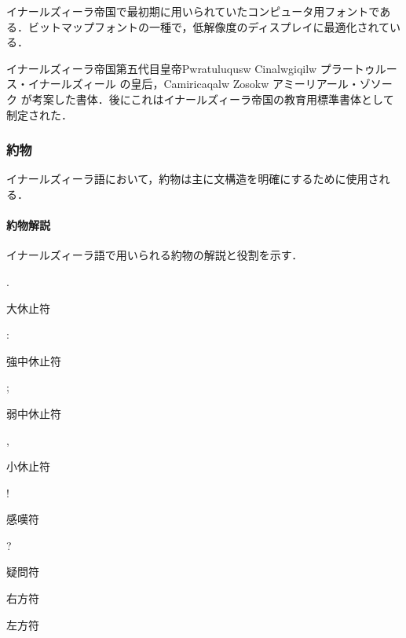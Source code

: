 \documentclass[
  japanese,
]{article}
\providecommand{\tightlist}{%
  \setlength{\itemsep}{0pt}\setlength{\parskip}{0pt}}
\begin{document}
\begin{description}
\begin{description}
\tightlist
\item[マキーナ体\\
{makina}]
イナールズィーラ帝国で最初期に用いられていたコンピュータ用フォントである．ビットマップフォントの一種で，低解像度のディスプレイに最適化されている．
\item[ポルゴ体\\
{polwgo}]
\item[ゾソーク体\\
{zosokw}]
イナールズィーラ帝国第五代目皇帝{Pwratuluqusw Cinalwgiqilw}
プラートゥルース・イナールズィール の皇后，{Camiricaqalw Zosokw}
アミーリアール・ゾソーク
が考案した書体．後にこれはイナールズィーラ帝国の教育用標準書体として制定された．
\end{description}
\end{description}

\subsubsection{約物}\label{section3.3}

イナールズィーラ語において，約物は主に文構造を明確にするために使用される．

\paragraph{約物解説}\label{subsection3.3.1}

イナールズィーラ語で用いられる約物の解説と役割を示す．

{.}

大休止符

{:}

強中休止符

{;}

弱中休止符

{,}

小休止符

{!}

感嘆符

{?}

疑問符

\begin{figure}
\centering
\caption{}\label{ltr-figure}
\end{figure}

右方符

\begin{figure}
\centering
\caption{}\label{rtl-figure}
\end{figure}

左方符
\end{document}
